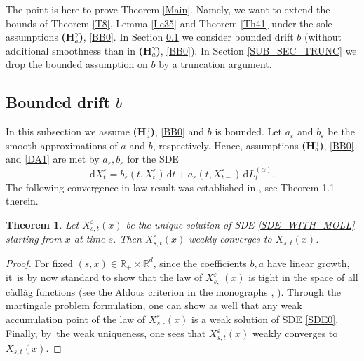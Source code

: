 \documentclass[JEP,XML,SOM,Unicode,published]{cedram}
\newcommand{\rd}{\mathrm{d}}
\theoremstyle{plain}
\newtheorem{theorem}{Theorem}[section]
\theoremstyle{definition}
\let\eps\varepsilon
\newcommand\mR{\mathbb{R}}
\newcommand\1{{\mathbf{1}}}
\newcommand{\dif}{\,\mathrm{d}}
\begin{document}
The point is here to prove Theorem \ref{Main}. Namely, we want to extend the bounds of Theorem \ref{T8}, Lemma \ref{Le35} and Theorem \ref{Th41} under the sole assumptions {\bf (H$^\gamma_a$)}, \eqref{BB0}.
In Section \ref{SUB_SEC_BD} we consider bounded drift $b$ (without additional smoothness than in {\bf (H$^\gamma_a$)}, \eqref{BB0}).
In Section \ref{SUB_SEC_TRUNC} we drop the bounded assumption on $b$ by a truncation argument.
\subsection{Bounded drift $b$}\label{SUB_SEC_BD}
In this subsection we assume {\bf (H$^\gamma_a$)}, \eqref{BB0} and $b$ is bounded.
Let $a_\eps$ and $b_\eps$ be the smooth approximations of $a$ and $b$, respectively. Hence, assumptions {\bf (H$^\gamma_a$)}, \eqref{BB0} and \eqref{DA1} are met by $a_\eps, b_\eps $ for the SDE
\begin{equation}\rd X_t^\eps=b_\eps(t,X_t^\eps)\dif t+a_\eps(t,X_{t-}^\eps)\dif L^{(\alpha)}_t.
\label{SDE_WITH_MOLL}
\end{equation}
The following convergence in law result was established in \cite{CHZ}, see Theorem 1.1 therein.
\begin{theorem}\label{Th62}
Let $X^\eps_{s,t}(x)$ be the unique solution of SDE \eqref{SDE_WITH_MOLL} starting from $x$ at time $s$. Then $X^\eps_{s,t}(x)$ weakly converges to $X_{s,t}(x)$.
\end{theorem}
\begin{proof}
For fixed $(s,x)\in\mR_+\times\mR^d$, since the coefficients $b,a$ {have} linear growth, it~is by now standard to show that the law of
$X^\eps_{s,\cdot}(x)$ is tight in the space of all càdlàg functions ({see \eg the Aldous criterion in the monographs \cite[Ch.\,VI, Th.\,4.5]{jaco:shir:87}, \cite{bass:11}}). {Through the martingale problem formulation}, one can show {as well} that any weak accumulation point of the law of
$X^\eps_{s,\cdot}(x)$ is a weak solution of SDE \eqref{SDE0}. Finally, by~the weak uniqueness, one sees that
$X^\eps_{s,t}(x)$ weakly converges to $X_{s,t}(x)$.
\end{proof}
\end{document}
